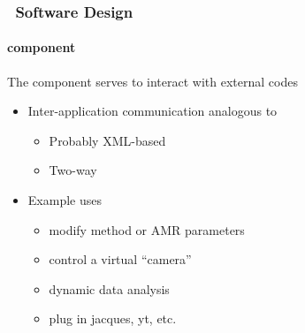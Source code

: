 \begin{frame}[fragile] 
\frametitle{\cello\ Software Design}
\framesubtitle{ component}
The  component serves to interact with external codes \\
\begin{itemize}
\item{} Inter-application communication analogous to 
\begin{itemize}
\item{}    Probably XML-based
\item{}    Two-way
\end{itemize}
\item{} Example uses
\begin{itemize}
\item{} modify method or AMR parameters
\item{} control a virtual ``camera''
\item{} dynamic data analysis
\item{} plug in jacques, yt, etc.
\end{itemize}
\end{itemize}
\end{frame}
%
%
%
